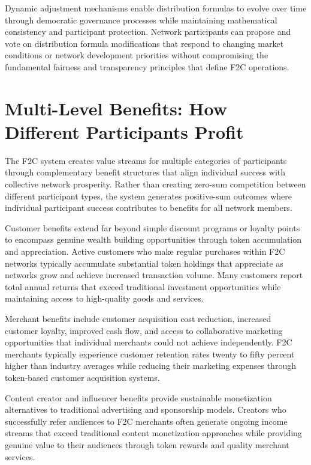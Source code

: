 \documentclass[
  Letterpaper,
]{scrbook}
\begin{document}
Dynamic adjustment mechanisms enable distribution formulas to evolve
over time through democratic governance processes while maintaining
mathematical consistency and participant protection. Network
participants can propose and vote on distribution formula modifications
that respond to changing market conditions or network development
priorities without compromising the fundamental fairness and
transparency principles that define F2C operations.

\section{Multi-Level Benefits: How Different Participants
Profit}\label{multi-level-benefits-how-different-participants-profit}

The F2C system creates value streams for multiple categories of
participants through complementary benefit structures that align
individual success with collective network prosperity. Rather than
creating zero-sum competition between different participant types, the
system generates positive-sum outcomes where individual participant
success contributes to benefits for all network members.

Customer benefits extend far beyond simple discount programs or loyalty
points to encompass genuine wealth building opportunities through token
accumulation and appreciation. Active customers who make regular
purchases within F2C networks typically accumulate substantial token
holdings that appreciate as networks grow and achieve increased
transaction volume. Many customers report total annual returns that
exceed traditional investment opportunities while maintaining access to
high-quality goods and services.

Merchant benefits include customer acquisition cost reduction, increased
customer loyalty, improved cash flow, and access to collaborative
marketing opportunities that individual merchants could not achieve
independently. F2C merchants typically experience customer retention
rates twenty to fifty percent higher than industry averages while
reducing their marketing expenses through token-based customer
acquisition systems.

Content creator and influencer benefits provide sustainable monetization
alternatives to traditional advertising and sponsorship models. Creators
who successfully refer audiences to F2C merchants often generate ongoing
income streams that exceed traditional content monetization approaches
while providing genuine value to their audiences through token rewards
and quality merchant services.
\end{document}
